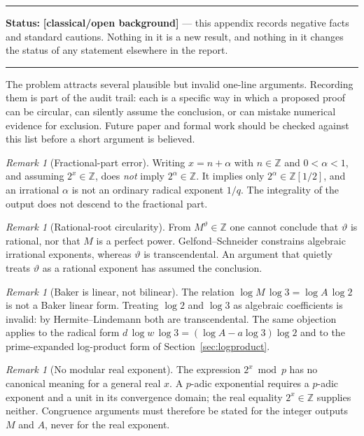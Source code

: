 \documentclass[11pt,oneside]{article}
\theoremstyle{definition}
\theoremstyle{remark}
\newtheorem{remark}[theorem]{Remark}
\newcommand{\Z}{\mathbb Z}
\newcommand{\thetaq}{\vartheta}
\newcommand{\Ztwo}{\Z[1/2]}
\newcommand{\statusknown}{\textcolor{classicalgray}{\textbf{[classical/open background]}}}
\newenvironment{statusbox}[1]
{\begin{center}\begin{minipage}{0.94\textwidth}\raggedright\hbadness=10000\hrule
\vspace{0.45em}\textbf{Status:} #1\par\vspace{0.35em}}
{\vspace{0.35em}\hrule\end{minipage}\end{center}}
\begin{document}
\begin{statusbox}{\statusknown{} --- this appendix records negative facts and standard
cautions.  Nothing in it is a new result, and nothing in it changes the status of any
statement elsewhere in the report.}
\end{statusbox}

The problem attracts several plausible but invalid one-line arguments.  Recording them is
part of the audit trail: each is a specific way in which a proposed proof can be circular,
can silently assume the conclusion, or can mistake numerical evidence for exclusion.  Future
paper and formal work should be checked against this list before a short argument is
believed.

\begin{remark}[Fractional-part error]
\label{a4:warn-fract}
Writing $x=n+\alpha$ with $n\in\Z$ and $0<\alpha<1$, and assuming $2^{x}\in\Z$, does
\emph{not} imply $2^{\alpha}\in\Z$.  It implies only $2^{\alpha}\in\Ztwo$, and an irrational
$\alpha$ is not an ordinary radical exponent $1/q$.  The integrality of the output does not
descend to the fractional part.
\end{remark}

\begin{remark}[Rational-root circularity]
\label{a4:warn-circular}
From $M^{\thetaq}\in\Z$ one cannot conclude that $\thetaq$ is rational, nor that $M$ is a
perfect power.  Gelfond--Schneider constrains algebraic irrational exponents, whereas
$\thetaq$ is transcendental.  An argument that quietly treats $\thetaq$ as a rational
exponent has assumed the conclusion.
\end{remark}

\begin{remark}[Baker is linear, not bilinear]
\label{a4:warn-bilinear}
The relation $\log M\,\log3=\log A\,\log2$ is not a Baker linear form.  Treating $\log2$ and
$\log3$ as algebraic coefficients is invalid: by Hermite--Lindemann both are transcendental.
The same objection applies to the radical form $d\,\log w\,\log3=(\log A-a\log3)\log2$ and to
the prime-expanded log-product form of Section~\ref{sec:logproduct}.
\end{remark}

\begin{remark}[No modular real exponent]
\label{a4:warn-modular}
The expression $2^{x}\bmod p$ has no canonical meaning for a general real $x$.  A $p$-adic
exponential requires a $p$-adic exponent and a unit in its convergence domain; the real
equality $2^{x}\in\Z$ supplies neither.  Congruence arguments must therefore be stated for
the integer outputs $M$ and $A$, never for the real exponent.
\end{remark}
\end{document}
